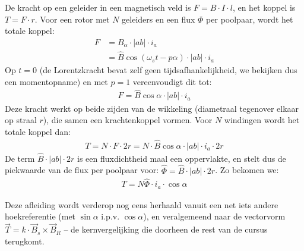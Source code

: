 De kracht op een geleider in een magnetisch veld is $F = B \cdot I \cdot l$, en het koppel
is $T = F \cdot r$.
Voor een rotor met $N$ geleiders en een flux $\Phi$ per poolpaar, wordt het totale koppel:
\begin{align*}
    F &= B_{\alpha} \cdot |ab| \cdot i_a \\
    &= \hat{B} \cos(\omega_s t - p\alpha) \cdot |ab| \cdot i_a
\end{align*}
Op $t=0$ (de Lorentzkracht bevat zelf geen tijdsafhankelijkheid, we bekijken dus een
momentopname) en met $p=1$ vereenvoudigt dit tot:
\begin{align*}
    F = \hat{B} \cos\alpha \cdot |ab| \cdot i_a
\end{align*}
Deze kracht werkt op beide zijden van de wikkeling (diametraal tegenover elkaar op straal
$r$), die samen een krachtenkoppel vormen.
Voor $N$ windingen wordt het totale koppel dan:
\begin{align*}
    T = N \cdot F \cdot 2r = N \cdot \hat{B}\cos\alpha \cdot |ab| \cdot i_a \cdot 2r
\end{align*}
De term $\hat{B} \cdot |ab| \cdot 2r$ is een fluxdichtheid maal een oppervlakte, en stelt
dus de piekwaarde van de flux per poolpaar voor:
$\hat{\Phi} = \hat{B}\cdot|ab|\cdot 2r$.
Zo bekomen we:
\begin{align*}
    \boxed{T = N \hat{\Phi} \cdot i_a \cdot \cos\alpha}
\end{align*}

Deze afleiding wordt verderop nog eens herhaald vanuit een net iets andere hoekreferentie
(met $\sin\alpha$ i.p.v.
$\cos\alpha$), en veralgemeend naar de vectorvorm
$\vec{T} = k \cdot \vec{B}_s \times \vec{B}_R$ -- de kernvergelijking die doorheen de rest
van de cursus terugkomt.

